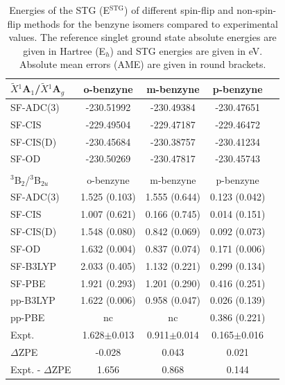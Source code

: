 \documentclass[aip,graphicx,amsmath,reprint]{revtex4-1}
\begin{document}
\begin{table}[h!]
\caption{\label{tab:benzyne}Energies of the STG (E$^{{\text{STG}}}$) of different spin-flip and non-spin-flip methods for the benzyne isomers compared to experimental values. The reference singlet ground state absolute energies are given in Hartree (E$_h$) and STG energies are given in eV. Absolute mean errors (AME) are given in round brackets.}
\begin{ruledtabular}
\begin{tabular}{lcccc}
$\tilde{X}$$^1$A$_1$/$\tilde{X}$$^1$A$_g$& o-benzyne & m-benzyne& p-benzyne& \\
\hline
SF-ADC(3)\footnotemark[1]&-230.51992&-230.49384&-230.47651\\
SF-CIS\footnotemark[2]&-229.49504&-229.47187&-229.46472\\
SF-CIS(D)\footnotemark[2]&-230.45684&-230.38757&-230.41234\\
SF-OD\footnotemark[2]&-230.50269&-230.47817&-230.45743\\
&&&\\
$^3$B$_2$/$^3$B$_{2u}$& o-benzyne & m-benzyne& p-benzyne& \\
\hline
SF-ADC(3)\footnotemark[1]&1.525 (0.103)&1.555 (0.644)&0.123 (0.042)\\
SF-CIS\footnotemark[2]&1.007 (0.621)&0.166 (0.745)&0.014 (0.151)\\
SF-CIS(D)\footnotemark[2]&1.548 (0.080)&0.842 (0.069)&0.092 (0.073)\\
SF-OD\footnotemark[2]&1.632 (0.004)& 0.837 (0.074)&0.171 (0.006)\\
SF-B3LYP\footnotemark[3]&2.033 (0.405)&1.132 (0.221)&0.299 (0.134)\\
SF-PBE\footnotemark[3]&1.921 (0.293)&1.201 (0.290)&0.416 (0.251)\\
pp-B3LYP\footnotemark[4]&1.622 (0.006)&0.958 (0.047)&0.026 (0.139)\\
pp-PBE\footnotemark[4]&nc&nc&0.386 (0.221)\\
Expt.\footnotemark[5]&1.628$\pm$0.013&0.911$\pm$0.014&0.165$\pm$0.016\\
$\Delta$ZPE\footnotemark[6]&-0.028&0.043&0.021\\
Expt. - $\Delta$ZPE\footnotemark[6]&1.656&0.868&0.144\\
\end{tabular}
\end{ruledtabular}
\end{table}
\end{document}
